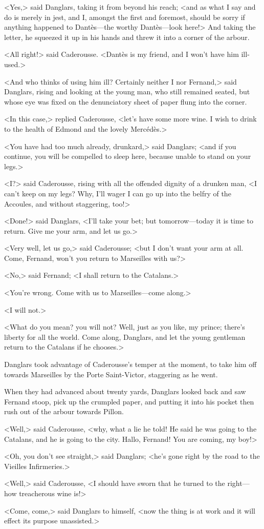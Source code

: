  <Yes,> said Danglars, taking it from beyond his reach; <and as what I say and do is merely in jest, and I\@, amongst the first and foremost, should be sorry if anything happened to Dantès—the worthy Dantès—look here!> And taking the letter, he squeezed it up in his hands and threw it into a corner of the arbour. 

 <All right!> said Caderousse. <Dantès is my friend, and I won't have him ill-used.> 

 <And who thinks of using him ill? Certainly neither I nor Fernand,> said Danglars, rising and looking at the young man, who still remained seated, but whose eye was fixed on the denunciatory sheet of paper flung into the corner. 

 <In this case,> replied Caderousse, <let's have some more wine. I wish to drink to the health of Edmond and the lovely Mercédès.> 

 <You have had too much already, drunkard,> said Danglars; <and if you continue, you will be compelled to sleep here, because unable to stand on your legs.> 

 <I\@?> said Caderousse, rising with all the offended dignity of a drunken man, <I can't keep on my legs? Why, I'll wager I can go up into the belfry of the Accoules, and without staggering, too!> 

 <Done!> said Danglars, <I'll take your bet; but tomorrow—today it is time to return. Give me your arm, and let us go.> 

 <Very well, let us go,> said Caderousse; <but I don't want your arm at all. Come, Fernand, won't you return to Marseilles with us?> 

 <No,> said Fernand; <I shall return to the Catalans.> 

 <You're wrong. Come with us to Marseilles—come along.> 

 <I will not.> 

 <What do you mean? you will not? Well, just as you like, my prince; there's liberty for all the world. Come along, Danglars, and let the young gentleman return to the Catalans if he chooses.> 

 Danglars took advantage of Caderousse's temper at the moment, to take him off towards Marseilles by the Porte Saint-Victor, staggering as he went. 

 When they had advanced about twenty yards, Danglars looked back and saw Fernand stoop, pick up the crumpled paper, and putting it into his pocket then rush out of the arbour towards Pillon. 

 <Well,> said Caderousse, <why, what a lie he told! He said he was going to the Catalans, and he is going to the city. Hallo, Fernand! You are coming, my boy!> 

 <Oh, you don't see straight,> said Danglars; <he's gone right by the road to the Vieilles Infirmeries.> 

 <Well,> said Caderousse, <I should have sworn that he turned to the right—how treacherous wine is!> 

 <Come, come,> said Danglars to himself, <now the thing is at work and it will effect its purpose unassisted.> 